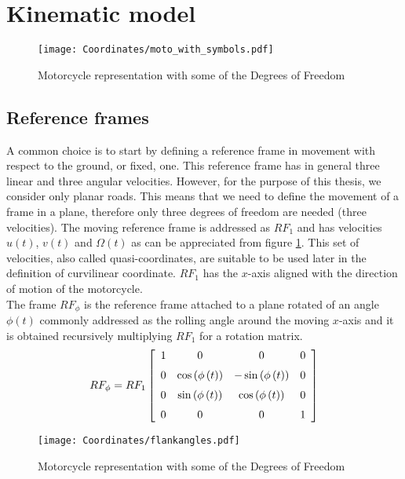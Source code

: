 \section{Kinematic model}
%
\begin{figure}[!htb]
    \centering
    \texttt{[image: Coordinates/moto\_with\_symbols.pdf]}
    \caption{Motorcycle representation with some of the Degrees of Freedom}
    \label{fig:MotoLean}
\end{figure}
%
\subsection{Reference frames}
%
A common choice is to start by defining a reference frame in movement with respect to the ground, or fixed, one. This reference frame has in general three linear and three angular velocities. However, for the purpose of this thesis, we consider only planar roads. This means that we need to define the movement of a frame in a plane, therefore only three degrees of freedom are needed (three velocities). The moving reference frame is addressed as $RF_1$ and has velocities $u(t)$, $v(t)$ and $\Omega(t)$ as can be appreciated from figure \ref{fig:MotoLean}. This set of velocities, also called quasi-coordinates, are suitable to be used later in the definition of curvilinear coordinate. $RF_1$ has the $x$-axis aligned with the direction of motion of the motorcycle. \\
The frame $RF_\phi$ is the reference frame attached to a plane rotated of an angle $\phi(t)$ commonly addressed as the rolling angle around the moving $x$-axis and it is obtained recursively multiplying $RF_1$ for a rotation matrix.
%
\begin{equation}
    RF_\phi = RF_1 
    \left[ \begin {array}{cccc} 1&0&0&0\\ \noalign{\medskip}0&\cos
    \left( \phi \left( t \right)  \right) &-\sin \left( \phi \left( t
    \right)  \right) &0\\ \noalign{\medskip}0&\sin \left( \phi \left( t
    \right)  \right) &\cos \left( \phi \left( t \right)  \right) &0
   \\ \noalign{\medskip}0&0&0&1\end {array} \right]   
\end{equation}
%
%
\begin{figure}[!htb]
    \centering
    \texttt{[image: Coordinates/flankangles.pdf]}
    \caption{Motorcycle representation with some of the Degrees of Freedom}
    \label{fig:MotoFlank}
\end{figure}
